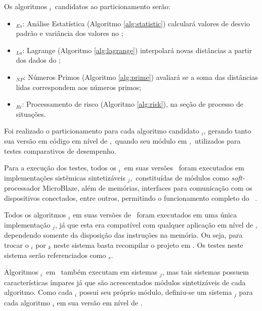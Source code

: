         Os algoritmos \A$_{i}$\ candidatos ao particionamento serão:
        
        \begin{itemize}
            \item \A$_{Es}$: Análise Estatística (Algoritmo \ref{alg:statistic}) calculará valores de desvio padrão e variância dos valores no \buffer;
            
            \item \A$_{La}$: Lagrange (Algoritmo \ref{alg:lagrange}) interpolará novas distâncias a partir dos dados do \buffer; 
            \item \A$_{NP}$: Números Primos (Algoritmo \ref{alg:prime}) avaliará se a soma das distâncias lidas correspondem aos números primos;
            \item \A$_{Ri}$: Processamento de risco (Algoritmo \ref{alg:risk}), na seção de processo de situações.
        \end{itemize}
    
    
        
        Foi realizado o particionamento para cada algoritmo candidato \A$_{i}$, gerando tanto sua versão em código em nível de \software,\ quando seu módulo em \hardware,\ utilizados para testes comparativos de desempenho.
        
        Para a execução dos testes, todos os \A$ _i $\ em suas versões \hs\ foram executados em implementações sistêmicas sintetizáveis \Ss$ _j $,\ constituídas de módulos como \textit{soft-}processador MicroBlaze, além de memórias, interfaces para comunicação com os dispositivos conectados, entre outros, permitindo o funcionamento completo do \wearable\ \citep{obeidat2011microblaze}.
        
        Todos os algoritmos \A$_{i}$ em suas versões de \software\ foram executados em uma única implementação \Ss$ _j $, já que esta era compatível com qualquer aplicação em nível de \software, dependendo somente da disposição das instruções na memória.
        Ou seja, para trocar o \A$_{i}$ por \A$_{k}$ neste sistema basta recompilar o projeto em \software.
        Os testes neste sistema serão referenciados como \Ss$ _{s} $.
        
        Algoritmos \A$ _i $\ em \hardware\ também executam em sistemas \Ss$ _j $, mas tais sistemas possuem características ímpares já que são acrescentados módulos sintetizáveis de cada algoritmo.
        Como cada \A$_i$ possui seu próprio módulo, definiu-se um sistema \Ss$_j$ para cada algoritmo \A$_{i}$ em sua versão em nível de \hardware.
        
